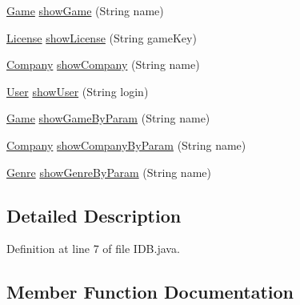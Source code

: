 \begin{DoxyCompactItemize}
\item 
\hyperlink{classes_1_1deusto_1_1server_1_1db_1_1data_1_1_game}{Game} \hyperlink{interfacees_1_1deusto_1_1server_1_1db_1_1_i_d_b_a572028cc62d36bebee977200b55eba8b}{show\+Game} (String name)
\item 
\hyperlink{classes_1_1deusto_1_1server_1_1db_1_1data_1_1_license}{License} \hyperlink{interfacees_1_1deusto_1_1server_1_1db_1_1_i_d_b_ad408b5a93077c152ceba270caa34fd0a}{show\+License} (String game\+Key)
\item 
\hyperlink{classes_1_1deusto_1_1server_1_1db_1_1data_1_1_company}{Company} \hyperlink{interfacees_1_1deusto_1_1server_1_1db_1_1_i_d_b_a1681e29b5fbe4377b19e67fa939b2782}{show\+Company} (String name)
\item 
\hyperlink{classes_1_1deusto_1_1server_1_1db_1_1data_1_1_user}{User} \hyperlink{interfacees_1_1deusto_1_1server_1_1db_1_1_i_d_b_aa2f6a5291fa8aa78d5a73b5878d17986}{show\+User} (String login)
\item 
\hyperlink{classes_1_1deusto_1_1server_1_1db_1_1data_1_1_game}{Game} \hyperlink{interfacees_1_1deusto_1_1server_1_1db_1_1_i_d_b_a0364013a2f73f89fd5f8c635d5c9405a}{show\+Game\+By\+Param} (String name)
\item 
\hyperlink{classes_1_1deusto_1_1server_1_1db_1_1data_1_1_company}{Company} \hyperlink{interfacees_1_1deusto_1_1server_1_1db_1_1_i_d_b_aed0409031510630d50085eca53aff113}{show\+Company\+By\+Param} (String name)
\item 
\hyperlink{classes_1_1deusto_1_1server_1_1db_1_1data_1_1_genre}{Genre} \hyperlink{interfacees_1_1deusto_1_1server_1_1db_1_1_i_d_b_a836faee771a447be79c36d7d4289c614}{show\+Genre\+By\+Param} (String name)
\end{DoxyCompactItemize}


\subsection{Detailed Description}


Definition at line 7 of file I\+D\+B.\+java.



\subsection{Member Function Documentation}
\mbox{\label{interfacees_1_1deusto_1_1server_1_1db_1_1_i_d_b_a645335b2cbfa27c0199783ff2f33559e}} 
